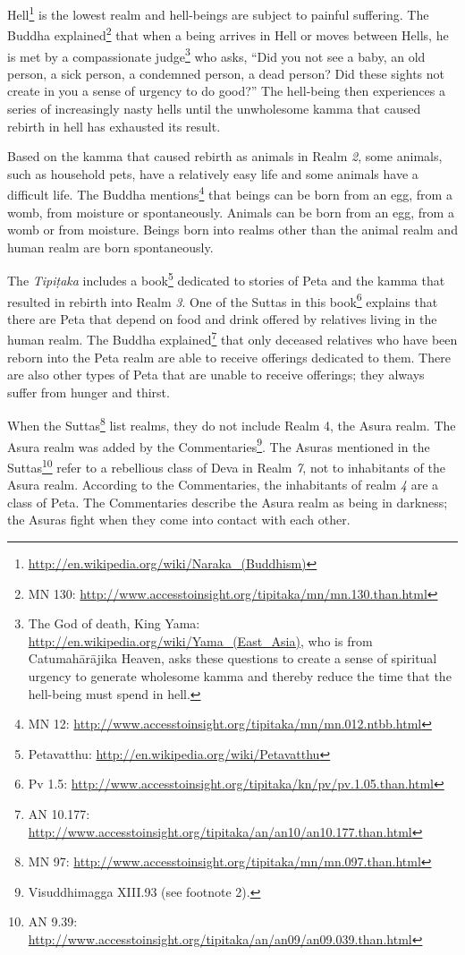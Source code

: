 Hell\footnote{\url{http://en.wikipedia.org/wiki/Naraka_(Buddhism)}} is the lowest realm and hell-beings are subject to painful suffering. The Buddha explained\footnote{MN 130: \url{http://www.accesstoinsight.org/tipitaka/mn/mn.130.than.html}} that when a being arrives in Hell or moves between Hells, he is met by a compassionate judge\footnote{The God of death, King Yama: \url{http://en.wikipedia.org/wiki/Yama_(East_Asia)}, who is from Catumahārājika Heaven, asks these questions to create a sense of spiritual urgency to generate wholesome kamma and thereby reduce the time that the hell-being must spend in hell.} who asks, “Did you not see a baby, an old person, a sick person, a condemned person, a dead person? Did these sights not create in you a sense of urgency to do good?” The hell-being then experiences a series of increasingly nasty hells until the unwholesome kamma that caused rebirth in hell has exhausted its result.

Based on the kamma that caused rebirth as animals in Realm \textit{2}, some animals, such as household pets, have a relatively easy life and some animals have a difficult life. The Buddha mentions\footnote{MN 12: \url{http://www.accesstoinsight.org/tipitaka/mn/mn.012.ntbb.html}} that beings can be born from an egg, from a womb, from moisture or spontaneously. Animals can be born from an egg, from a womb or from moisture. Beings born into realms other than the animal realm and human realm are born spontaneously.

The \textit{Tipiṭaka} includes a book\footnote{Petavatthu: \url{http://en.wikipedia.org/wiki/Petavatthu}} dedicated to stories of Peta and the kamma that resulted in rebirth into Realm \textit{3}. One of the Suttas in this book\footnote{Pv 1.5: \url{http://www.accesstoinsight.org/tipitaka/kn/pv/pv.1.05.than.html}} explains that there are Peta that depend on food and drink offered by relatives living in the human realm. The Buddha explained\footnote{AN 10.177: \url{http://www.accesstoinsight.org/tipitaka/an/an10/an10.177.than.html}} that only deceased relatives who have been reborn into the Peta realm are able to receive offerings dedicated to them. There are also other types of Peta that are unable to receive offerings; they always suffer from hunger and thirst.

When the Suttas\footnote{MN 97: \url{http://www.accesstoinsight.org/tipitaka/mn/mn.097.than.html}} list realms, they do not include Realm 4, the Asura realm. The Asura realm was added by the Commentaries\footnote{Visuddhimagga XIII.93 (see footnote 2).}. The Asuras mentioned in the Suttas\footnote{AN 9.39: \url{http://www.accesstoinsight.org/tipitaka/an/an09/an09.039.than.html}} refer to a rebellious class of Deva in Realm \textit{7}, not to inhabitants of the Asura realm. According to the Commentaries, the inhabitants of realm \textit{4} are a class of Peta. The Commentaries describe the Asura realm as being in darkness; the Asuras fight when they come into contact with each other.

